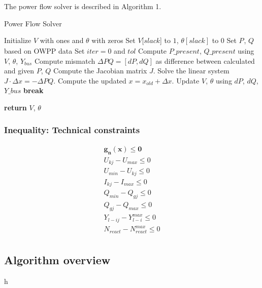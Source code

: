 \documentclass[a4paper,11pt, titlepage, twoside]{article}
\begin{document}
The power flow solver is described in Algorithm 1.
\begin{algorithm}[h]
    \caption{Power Flow Solver}
    \begin{algorithmic}[1]
        \State Initialize $V$ with ones and $\theta$ with zeros
        \Statex \hspace{\algorithmicindent}Set $V[slack$] to $1$, $\theta[slack]$ to $0$
        \Statex \hspace{\algorithmicindent}Set $P_{}$, $Q_{}$ based on OWPP data
        \Statex \hspace{\algorithmicindent}Set $iter = 0 $ and $tol$
            \State Compute $P\_present$, $Q\_present$ using $V$, $\theta$, $Y_{bus}$
            \State Compute mismatch $\Delta PQ = [dP, dQ]$ as difference between calculated and given $P$, $Q$
            \State Compute the Jacobian matrix $J$.
            \State Solve the linear system $J \cdot \Delta x = -\Delta PQ$.
            \State Compute the updated $x = x_{old} + \Delta x $.
            \State Update $V$, $\theta$ using $dP$, $dQ$, $Y\_bus$
                \State \textbf{break}
            \EndIf
            
        \EndWhile
        \State \textbf{return} $V$, $\theta$
    \EndProcedure
    \end{algorithmic}
    \end{algorithm}

\subsubsection{Inequality: Technical constraints}

\begin{gather}
    \mathbf{g_n(x)\leq0} \\
    U_{kj}-U_{max}\leq0 \\
    U_{min}-U_{kj}\leq0 \\
    I_{kj}-I_{max}\leq0 \\
    Q_{min}-Q_{gj}\leq0 \\
    Q_{gj}-Q_{max}\leq0 \\
    Y_{l-ij}-Y_{l-i}^{max}\leq0 \\
    N_{react}-N_{react}^{max}\leq0 \\
\end{gather}

\newpage
\subsection{Algorithm overview}
h
\end{document}

